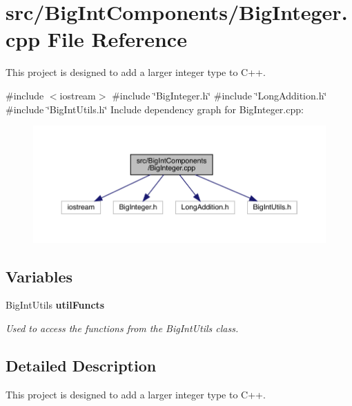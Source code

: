 \section{src/\+Big\+Int\+Components/\+Big\+Integer.cpp File Reference}
\label{_big_integer_8cpp}


This project is designed to add a larger integer type to C++.  


{\ttfamily \#include $<$iostream$>$}\newline
{\ttfamily \#include \char`\"{}Big\+Integer.\+h\char`\"{}}\newline
{\ttfamily \#include \char`\"{}Long\+Addition.\+h\char`\"{}}\newline
{\ttfamily \#include \char`\"{}Big\+Int\+Utils.\+h\char`\"{}}\newline
Include dependency graph for Big\+Integer.\+cpp\+:\nopagebreak
\begin{figure}[H]
\begin{center}
\leavevmode
\includegraphics[width=350pt]{_big_integer_8cpp__incl}
\end{center}
\end{figure}
\subsection*{Variables}
\begin{DoxyCompactItemize}
\item 
\mbox{\label{_big_integer_8cpp_a7397ede99a45be9ab531200d4efa7706}} 
Big\+Int\+Utils \textbf{ util\+Functs}
\begin{DoxyCompactList}\small\item\em Used to access the functions from the Big\+Int\+Utils class. \end{DoxyCompactList}\end{DoxyCompactItemize}


\subsection{Detailed Description}
This project is designed to add a larger integer type to C++. 


